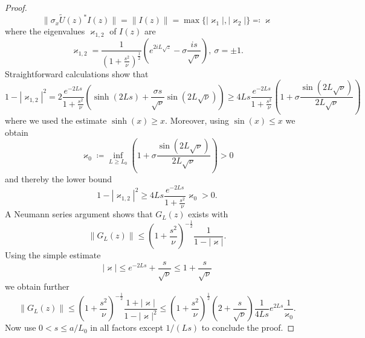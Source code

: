 \begin{proof}
\begin{equation*}
  \|\sigma_x \tilde U(z)^*I(z)\| = \|I(z)\| = \max\{ |\varkappa_1|,|\varkappa_2| \} \eqqcolon \varkappa
\end{equation*}
where the eigenvalues $\varkappa_{1,2}$ of $I(z)$ are
\begin{equation*}
  \varkappa_{1,2} = \frac{1}{(1+\frac{s^2}{\nu})^{\frac{1}{2}}} ( e^{2iL\sqrt{z}} -\sigma \frac{is}{\sqrt{\nu}} ),\ \sigma = \pm 1 .
\end{equation*}
Straightforward calculations show that
\begin{equation*}
   1 - |\varkappa_{1,2}|^2
      =  2 \frac{e^{-2Ls}}{1+\frac{s^2}{\nu}} ( \sinh(2Ls) + \frac{\sigma s}{\sqrt{\nu}}\sin(2L\sqrt\nu) ) 
      \geq 4Ls \frac{e^{-2Ls}}{1+\frac{s^2}{\nu}} ( 1 + \sigma \frac{\sin(2L\sqrt\nu)}{2L\sqrt{\nu}} )
\end{equation*}
where we used the estimate $\sinh(x)\geq x$. Moreover, using $\sin(x)\leq x$ we obtain
\begin{equation*}
  \varkappa_0 \coloneqq \inf_{L\geq L_0} ( 1 + \sigma \frac{\sin(2L\sqrt\nu)}{2L\sqrt{\nu}} ) > 0 
\end{equation*}
and thereby the lower bound
\begin{equation*}
 1 - |\varkappa_{1,2}|^2
      \geq 4Ls \frac{e^{-2Ls}}{1+\frac{s^2}{\nu}} \varkappa_0
      > 0 .
\end{equation*}
A Neumann series argument shows that $G_L(z)$ exists with
\begin{equation*}
  \| G_L(z)\| \leq (1+\frac{s^2}{\nu})^{-\frac{1}{2}} \frac{1}{1-|\varkappa|} .
\end{equation*}
Using the simple estimate
\begin{equation*}
  |\varkappa|  \leq e^{-2Ls} + \frac{s}{\sqrt{\nu}} \leq 1 + \frac{s}{\sqrt{\nu}} 
\end{equation*}
we obtain further
\begin{equation*}
  \| G_L(z)\| 
     \leq (1+\frac{s^2}{\nu})^{-\frac{1}{2}} \frac{1+|\varkappa|}{1-|\varkappa|^2}
     \leq (1+\frac{s^2}{\nu})^{\frac{1}{2}} (2+\frac{s}{\sqrt{\nu}}) \frac{1}{4Ls} e^{2Ls} \frac{1}{\varkappa_0} .
\end{equation*}
Now use $0<s\leq a/L_0$ in all factors except $1/(Ls)$ to conclude the proof.
\end{proof}
